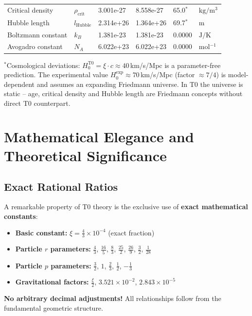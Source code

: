 \begin{longtable}{>{\raggedright}p{4.0cm}p{1.2cm}p{1.8cm}p{2.0cm}p{1.6cm}p{2.0cm}}
		Critical density & $\rho_{\text{crit}}$ & 3.001e-27 & 8.558e-27 & 65.0$^*$ & $\si{\kilogram \per \meter^3}$ \\
		Hubble length & $l_{\text{Hubble}}$ & 2.314e+26 & 1.364e+26 & 69.7$^*$ & $\si{\meter}$ \\
		Boltzmann constant & $k_B$ & 1.381e-23 & 1.381e-23 & 0.0000 & $\si{\joule \per \kelvin}$ \\
		Avogadro constant & $N_A$ & 6.022e+23 & 6.022e+23 & 0.0000 & $\si{\mole^{-1}}$ \\
	\end{longtable}
	\normalsize
	
	{\small $^*$Cosmological deviations: $H_0^{\text{T0}} = \xi \cdot c \approx 40\,$km/s/Mpc is a parameter-free prediction. The experimental value $H_0^{\text{exp}} \approx 70\,$km/s/Mpc (factor $\approx 7/4$) is model-dependent and assumes an expanding Friedmann universe. In T0 the universe is static -- age, critical density and Hubble length are Friedmann concepts without direct T0 counterpart.}
	
	\section{Mathematical Elegance and Theoretical Significance}
	
	\subsection{Exact Rational Ratios}
	
	A remarkable property of T0 theory is the exclusive use of \textbf{exact mathematical constants}:
	
	\begin{itemize}
		\item \textbf{Basic constant:} $\xi = \frac{4}{3} \times 10^{-4}$ (exact fraction)
		\item \textbf{Particle $r$ parameters:} $\frac{4}{3}$, $\frac{16}{5}$, $\frac{8}{3}$, $\frac{25}{2}$, $\frac{26}{9}$, $\frac{3}{2}$, $\frac{1}{28}$
		\item \textbf{Particle $p$ parameters:} $\frac{3}{2}$, $1$, $\frac{2}{3}$, $\frac{1}{2}$, $-\frac{1}{3}$
		\item \textbf{Gravitational factors:} $\frac{\xi}{2}$, $3.521 \times 10^{-2}$, $2.843 \times 10^{-5}$
	\end{itemize}
	
	\textcolor{t0green}{\textbf{No arbitrary decimal adjustments!}} All relationships follow from the fundamental geometric structure.
	
